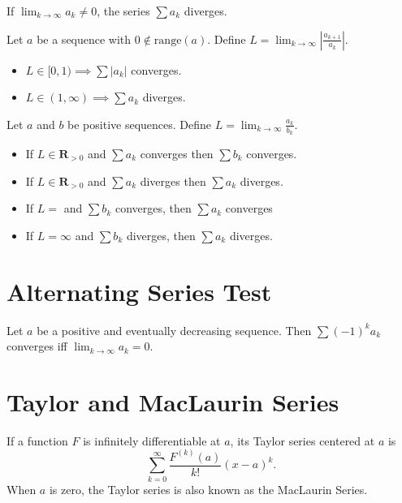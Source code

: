 \documentclass[letterpaper,landscape,9pt,fleqn]{extarticle}
\newcommand{\range}{\mathrm{range}}
\newcommand{\reals}{\mathbf{R}}
\begin{document}
\begin{multicols*}{2}
\begin{minipage}[c]{0.5\textwidth}

If $\lim_{k \to \infty} a_k  \neq 0$, the series $\sum a_k$ diverges.


Let $a$ be a sequence with $0 \notin \range(a)$. Define 
$L = \lim_{k \to \infty} \left| \frac{a_{k+1}}{a_k} \right|$.
\begin{itemize}[noitemsep]
\item $L \in [0,1) \implies \sum |a_k| $ converges.
\item $L \in (1,\infty) \implies \sum a_k $ diverges.
\end{itemize}


Let $a$ and $b$ be positive sequences. Define 
$L = \lim_{k \to \infty} \frac{a_k}{b_k}$.
\begin{itemize}[noitemsep]
    \item If $L \in \reals_{> 0}$ and $\sum a_k$ converges then  
    $\sum b_k$ converges.

    \item If $L \in \reals_{> 0}$ and $\sum a_k$ diverges then  
    $\sum a_k$ diverges.

    \item If $L = $ and $\sum b_k$  converges, then $\sum a_k $  converges
   
    \item If $L = \infty$ and $\sum b_k$ diverges, then $\sum a_k $ diverges.  
\end{itemize}
\end{minipage}

\vspace{0.25in} 

\section*{Alternating Series Test}
\vspace{0.25in}
\begin{minipage}[c]{0.5\textwidth}
Let  $a$ be a positive and eventually decreasing sequence. 
Then $\sum (-1)^k a_k$ converges iff $\lim_{k \to \infty} a_k = 0$.

\end{minipage}
\vspace{0.25in}
\section*{Taylor and MacLaurin Series}
\vspace{0.25in}
If a function $F$ is infinitely differentiable at $a$, its Taylor series centered at $a$ is
\begin{equation*}
  \sum_{k=0}^\infty \frac{F^{(k)}(a)}{k!}  (x-a)^k.
\end{equation*}
When $a$ is zero, the Taylor series is also known as the MacLaurin Series.

\end{multicols*}
\end{document}
